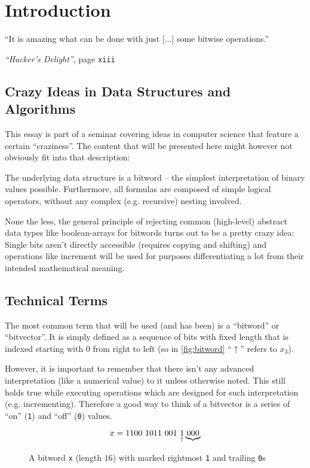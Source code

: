 \section{Introduction}\label{sec:introduction}
\epigraph{
``It is amazing what can be done
with just [...] some bitwise operations.''
}{
\emph{``Hacker's Delight''}, page \texttt{xiii}
\cite{Warren:2012:HD:2462741}
}


\subsection*{Crazy Ideas in Data Structures and Algorithms}
This essay is part of a seminar covering
ideas in computer science that feature a certain ``craziness''.
The content that will be presented here
might however not obviously fit into that description:

The underlying data structure is a bitword
-- the simplest interpretation of binary values possible.
Furthermore, all formulas are composed of simple logical operators,
without any complex (e.g. recursive) nesting involved.

None the less, the general principle of rejecting
common (high-level) abstract data types like boolean-arrays
for bitwords turns out to be a pretty crazy idea:
Single bits aren't directly accessible (requires copying and shifting)
and operations like increment will be used for
purposes differentiating a lot from their intended mathematical meaning.


\subsection*{Technical Terms}
The most common term that will be used (and has been)
is a ``bitword'' or ``bitvector''.
It is simply defined as a sequence of bits with fixed length
that is indexed starting with $0$ from right to left
(so in \autoref{fig:bitword} ``$\uparrow$'' refers to $x_3$).

However, it is important to remember that
there isn't any advanced interpretation (like a numerical value) to it
unless otherwise noted.
This still holds true while executing operations
which are designed for such interpretation (e.g. incrementing).
Therefore a good way to think of a bitvector
is a series of ``on'' (\lstinline$1$) and ``off'' (\lstinline$0$) values.

\begin{figure}[h]
\[
x = \lstinline$1100 1011 001 $
\underset{\uparrow}{\lstinline$1$}
\underbrace{\lstinline$000$}
\]
\caption{
A bitword \lstinline$x$ (length $16$)
with marked rightmost \lstinline$1$ and trailing \lstinline$0$s
}
\label{fig:bitword}
\end{figure}

